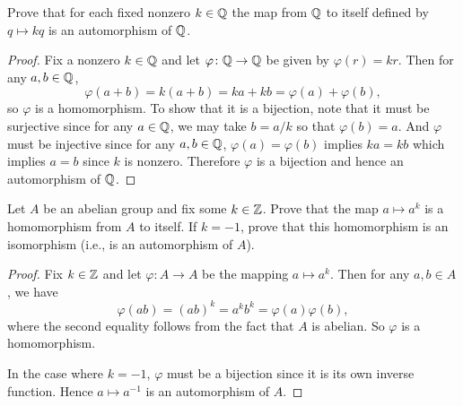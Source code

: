  Prove that for each fixed nonzero $k\in\mathbb{Q}$ the map from
$\mathbb{Q}$ to itself defined by $q\mapsto kq$ is an automorphism of $\mathbb{Q}$.
\begin{proof}
  Fix a nonzero $k\in\mathbb{Q}$ and let $\varphi\colon\mathbb{Q}\to\mathbb{Q}$ be given by
  $\varphi(r) = kr$. Then for any $a,b\in\mathbb{Q}$,
  \begin{equation*}
    \varphi(a + b) = k(a + b) = ka + kb = \varphi(a) + \varphi(b),
  \end{equation*}
  so $\varphi$ is a homomorphism. To show that it is a bijection, note
  that it must be surjective since for any $a\in\mathbb{Q}$, we may take
  $b = a/k$ so that $\varphi(b) = a$. And $\varphi$ must be injective
  since for any $a,b\in\mathbb{Q}$, $\varphi(a) = \varphi(b)$ implies
  $ka = kb$ which implies $a = b$ since $k$ is nonzero. Therefore
  $\varphi$ is a bijection and hence an automorphism of $\mathbb{Q}$.
\end{proof}

 Let $A$ be an abelian group and fix some $k\in\mathbb{Z}$. Prove
that the map $a\mapsto a^k$ is a homomorphism from $A$ to itself. If
$k = -1$, prove that this homomorphism is an isomorphism (i.e., is an
automorphism of $A$).
\begin{proof}
  Fix $k\in\mathbb{Z}$ and let $\varphi\colon A\to A$ be the mapping
  $a\mapsto a^k$. Then for any $a,b\in A$, we have
  \begin{equation*}
    \varphi(ab) = (ab)^k = a^kb^k = \varphi(a)\varphi(b),
  \end{equation*}
  where the second equality follows from the fact that $A$ is
  abelian. So $\varphi$ is a homomorphism.

  In the case where $k=-1$, $\varphi$ must be a bijection since it is
  its own inverse function. Hence $a\mapsto a^{-1}$ is an automorphism
  of $A$.
\end{proof}

